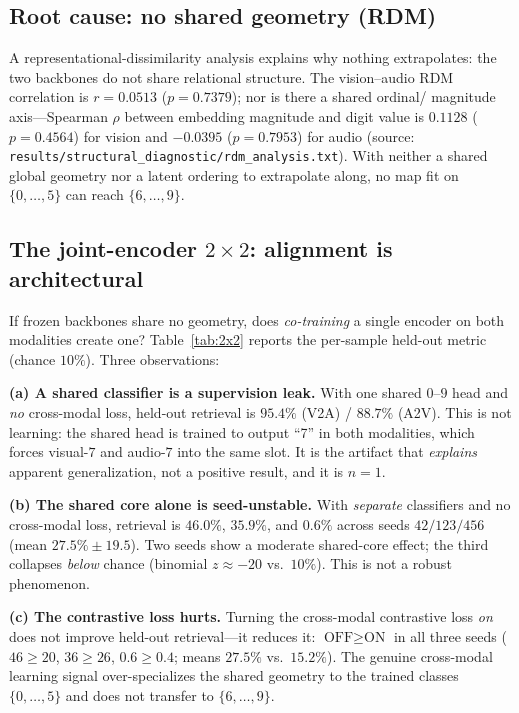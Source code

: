 \documentclass[conference]{IEEEtran}
\begin{document}
\subsection{Root cause: no shared geometry (RDM)}
A representational-dissimilarity analysis explains why nothing extrapolates:
the two backbones do not share relational structure. The vision--audio RDM
correlation is $r=0.0513$ ($p=0.7379$); nor is there a shared ordinal/
magnitude axis---Spearman $\rho$ between embedding magnitude and digit value
is $0.1128$ ($p=0.4564$) for vision and $-0.0395$ ($p=0.7953$) for audio
(source: \texttt{results/structural\_diagnostic/rdm\_analysis.txt}). With
neither a shared global geometry nor a latent ordering to extrapolate along,
no map fit on $\{0,\dots,5\}$ can reach $\{6,\dots,9\}$.

\subsection{The joint-encoder $2{\times}2$: alignment is architectural}
If frozen backbones share no geometry, does \emph{co-training} a single
encoder on both modalities create one? Table~\ref{tab:2x2} reports the
per-sample held-out metric (chance $10\%$). Three observations:

\textbf{(a) A shared classifier is a supervision leak.} With one shared
$0$--$9$ head and \emph{no} cross-modal loss, held-out retrieval is
$95.4\%$ (V2A) / $88.7\%$ (A2V). This is not learning: the shared head is
trained to output ``7'' in both modalities, which forces visual-$7$ and
audio-$7$ into the same slot. It is the artifact that \emph{explains}
apparent generalization, not a positive result, and it is $n{=}1$.

\textbf{(b) The shared core alone is seed-unstable.} With \emph{separate}
classifiers and no cross-modal loss, retrieval is $46.0\%$, $35.9\%$, and
$0.6\%$ across seeds $42/123/456$ (mean $27.5\%\pm19.5$). Two seeds show a
moderate shared-core effect; the third collapses \emph{below} chance
(binomial $z\approx-20$ vs.\ $10\%$). This is not a robust phenomenon.

\textbf{(c) The contrastive loss hurts.} Turning the cross-modal
contrastive loss \emph{on} does not improve held-out retrieval---it reduces
it: $\text{OFF}\ge\text{ON}$ in all three seeds ($46{\ge}20$,
$36{\ge}26$, $0.6{\ge}0.4$; means $27.5\%$ vs.\ $15.2\%$). The genuine
cross-modal learning signal over-specializes the shared geometry to the
trained classes $\{0,\dots,5\}$ and does not transfer to $\{6,\dots,9\}$.
\end{document}
